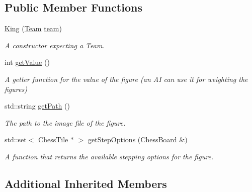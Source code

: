 \subsection*{Public Member Functions}
\begin{DoxyCompactItemize}
\item 
\mbox{\label{classKing_a3e945491cb38d473fcd809c11c15129e}} 
\mbox{\hyperlink{classKing_a3e945491cb38d473fcd809c11c15129e}{King}} (\mbox{\hyperlink{classChessFigure_a62f54318c1f28a08e6a6a2707f697a1d}{Team}} \mbox{\hyperlink{classChessFigure_ac7d0751a28c94d49927b9524390d1261}{team}})
\begin{DoxyCompactList}\small\item\em A constructor expecting a Team. \end{DoxyCompactList}\item 
\mbox{\label{classKing_a4778898c5534c04dd93194d22ef317c3}} 
int \mbox{\hyperlink{classKing_a4778898c5534c04dd93194d22ef317c3}{get\+Value}} ()
\begin{DoxyCompactList}\small\item\em A getter function for the value of the figure (an AI can use it for weighting the figures) \end{DoxyCompactList}\item 
\mbox{\label{classKing_a29a27a0f1280bb352d601d0aeeea13f1}} 
std\+::string \mbox{\hyperlink{classKing_a29a27a0f1280bb352d601d0aeeea13f1}{get\+Path}} ()
\begin{DoxyCompactList}\small\item\em The path to the image file of the figure. \end{DoxyCompactList}\item 
std\+::set$<$ \mbox{\hyperlink{classChessTile}{Chess\+Tile}} $\ast$ $>$ \mbox{\hyperlink{classKing_a69703f80ac8c30335e4d745ee11518d7}{get\+Step\+Options}} (\mbox{\hyperlink{classChessBoard}{Chess\+Board}} \&)
\begin{DoxyCompactList}\small\item\em A function that returns the available stepping options for the figure. \end{DoxyCompactList}\end{DoxyCompactItemize}
\subsection*{Additional Inherited Members}


